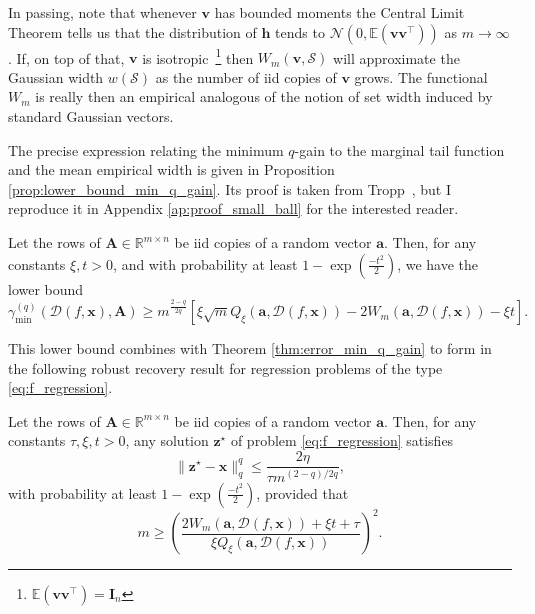 In passing, note that whenever $\mathbf{v}$ has bounded moments the Central Limit Theorem tells us that the distribution of $\mathbf{h}$ tends to $\mathcal{N}(0, \mathbb{E} \left ( \mathbf{v}\mathbf{v}^\top \right ))$ as $m \to \infty$. If, on top of that, $\mathbf{v}$ is isotropic~\footnote{$\mathbb{E} \left ( \mathbf{v}\mathbf{v}^\top \right )= \mathbf{I}_n$} then $W_{m}(\mathbf{v}, \mathcal{S})$ will approximate the Gaussian width $w(\mathcal{S})$ as the number of \acrshort{iid} copies of $\mathbf{v}$ grows. The functional $W_{m}$ is really then an empirical  analogous of the notion of set width induced by standard Gaussian vectors.

The precise expression relating the minimum $q$-gain to the marginal tail function and the mean empirical width is given in Proposition \ref{prop:lower_bound_min_q_gain}. Its proof is taken from Tropp~\cite{tropp2015a}, but I reproduce it in Appendix \ref{ap:proof_small_ball} for the interested reader.

\begin{proposition}\label{prop:lower_bound_min_q_gain}
    Let the rows of $\mathbf{A} \in \mathbb{R}^{m \times n}$ be \acrshort{iid} copies of a random vector $\mathbf{a}$. Then, for any constants $\xi, t > 0$, and with probability at least $1 - \exp \left ( \frac{-t^2}{2} \right )$, we have the lower bound
    \begin{equation}
        \gamma_{\min}^{(q)} \left ( \mathcal{D}( f, \mathbf{x}), \mathbf{A} \right ) \geq m^{\frac{2 - q}{2q}} \left [ \xi \sqrt{m} Q_{\xi}(\mathbf{a}, \mathcal{D}( f, \mathbf{x})) - 2 W_{m}(\mathbf{a}, \mathcal{D}( f, \mathbf{x})) - \xi t \right ].
    \end{equation}
\end{proposition}

This lower bound combines with Theorem \ref{thm:error_min_q_gain} to form in the following robust recovery result for regression problems of the type \eqref{eq:f_regression}.

\begin{corollary}\label{cor:sample_complexity_small_ball_method}
    Let the rows of $\mathbf{A} \in \mathbb{R}^{m \times n}$ be \acrshort{iid} copies of a random vector $\mathbf{a}$. Then, for any constants $\tau, \xi, t > 0$, any solution $\mathbf{z}^\star$ of problem \eqref{eq:f_regression} satisfies
    \begin{equation}
        \| \mathbf{z}^\star - \mathbf{x}\|_q^q \leq \frac{2 \eta}{\tau m^{(2 - q)/2q}},
    \end{equation}
    with probability at least $1 - \exp \left ( \frac{-t^2}{2} \right )$, provided that
    \begin{equation}
        m \geq \left ( \frac{2 W_{m}(\mathbf{a}, \mathcal{D}( f, \mathbf{x})) + \xi t + \tau}{\xi Q_{\xi}(\mathbf{a}, \mathcal{D}( f, \mathbf{x}))} \right )^2.
        \label{eq:sample_complexity_small_ball_method}
    \end{equation}
\end{corollary}


